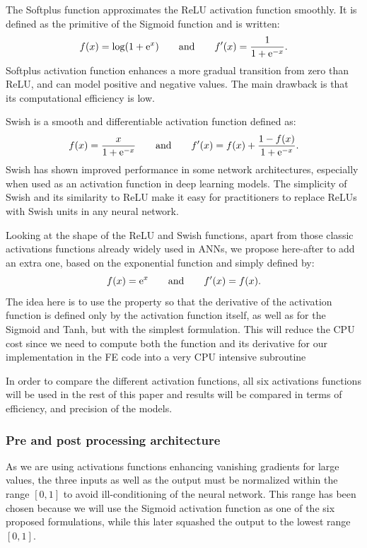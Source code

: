 \documentclass[algorithms,article,submit,pdftex,moreauthors]{Definitions/mdpi}
\DeclareRobustCommand{\e}[1]{{\rm e}^{#1}}
\begin{document}
The Softplus function \cite{Dugas-2000-ISO} approximates the ReLU activation function smoothly. It is defined as the primitive of the Sigmoid function and is written:
\begin{equation}
f(x) = \log\left(1+\e{x}\right)\qquad \text{and}\qquad f'(x) = \frac{1}{1+\e{-x}}.\label{eq:act-softplus}
\end{equation}
Softplus activation function enhances a more gradual transition from zero than ReLU, and can model positive and negative values.
The main drawback is that its computational efficiency is low.

Swish \cite{Ramachandran-2018-SAF} is a smooth and differentiable activation function defined as:
\begin{equation}
f(x) = \frac{x}{1+\e{-x}}\qquad \text{and}\qquad f'(x) =  f(x) + \frac{1 - f(x)}{1+\e{-x}}.\label{eq:act-swish}
\end{equation}
Swish has shown improved performance in some network architectures, especially when used as an activation function in deep learning models.
The simplicity of Swish and its similarity to ReLU make it easy for practitioners to replace ReLUs with Swish units in any neural network.
 
Looking at the shape of the ReLU and Swish functions, apart from those classic activations functions already widely used in ANNs, we propose here-after to add an extra one, based on the exponential function and simply defined by:
\begin{equation}
f(x) = \e{x}\qquad \text{and}\qquad f'(x) = f(x).\label{eq:act-exp}
\end{equation}
The idea here is to use the property so that the derivative of the activation function is defined only by the activation function itself, as well as for the Sigmoid and Tanh, but with the simplest formulation.
This will reduce the CPU cost since we need to compute both the function and its derivative for our implementation in the FE code into a very CPU intensive subroutine

In order to compare the different activation functions, all six activations functions will be used in the rest of this paper and results will be compared in terms of efficiency, and precision of the models.

\subsubsection{Pre and post processing architecture\label{subsubsec:ANN-pre}}
As we are using activations functions enhancing vanishing gradients for large values, the three inputs as well as the output must be normalized within the range $[0,1]$ to avoid ill-conditioning of the neural network.
This range has been chosen because we will use the Sigmoid activation function as one of the six proposed formulations, while this later squashed the output to the lowest range $[0,1]$.
\end{document}
